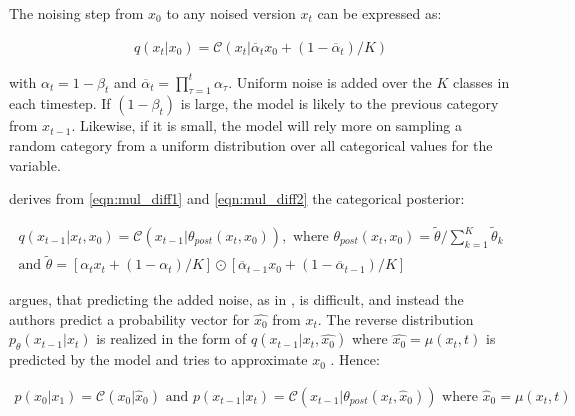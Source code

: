 The noising step from $x_0$ to any noised version $x_t$ can be expressed as:

\begin{equation}
  \begin{align*}
    \label{eqn:mul_diff2}
    q(x_{t}|x_{0}) = \mathcal{C}(x_t|\overline{\alpha}_tx_{0}+(1-\overline{\alpha}_t)/K)
  \end{align*}
\end{equation}

with $\alpha_t = 1-\beta_t$ and $\overline{\alpha}_t = \prod_{\tau=1}^{t}\alpha_\tau$.
Uniform noise is added over the $K$ classes in each timestep.
If $(1-\beta_t)$ is large, the model is likely to the previous category from $x_{t-1}$. 
Likewise, if it is small, the model will rely more on sampling a random category from a uniform distribution over all categorical values for the variable.

\cite{hoogeboom2021ArgmaxFlowsMultinomial} derives from \autoref{eqn:mul_diff1} and \autoref{eqn:mul_diff2} the categorical posterior:

\begin{equation}
  \begin{gathered}
  \label{eqn:mul_diff3}
  q(x_{t-1}|x_t, x_{0}) = \mathcal{C}(x_{t-1}|\theta_{post}(x_t,x_0)),\textrm{ where } \theta_{post}(x_t,x_0)=\tilde{\theta}/\sum_{k=1}^{K}\tilde{\theta}_k \\
  \textrm{and } \tilde{\theta} = \left[\alpha_tx_{t}+(1-\alpha_t)/K \right] \odot \left[\overline{\alpha}_{t-1}x_{0}+(1-\overline{\alpha}_{t-1})/K \right]
  \end{gathered}
\end{equation}

\cite{hoogeboom2021ArgmaxFlowsMultinomial} argues, that predicting the added noise, as in \cite{ho2020DenoisingDiffusionProbabilistic},
is difficult, and instead the authors predict a probability vector for $\hat{x_0}$ from $x_t$.
The reverse distribution $p_\theta(x_{t-1}|x_t)$ is realized in the form of $q(x_{t-1}|x_t,\hat{x_0})$ where $\hat{x_0}=\mu(x_t, t)$ is predicted by the model and tries to approximate $x_0$ \cite{hoogeboom2021ArgmaxFlowsMultinomial}.
Hence:

\begin{equation}
  \begin{align*}
    \label{eqn:mul_diff4}
    p(x_0|x_1) = \mathcal{C}(x_0|\hat{x}_0) \textrm{ and } p(x_{t-1}|x_t) =  \mathcal{C}(x_{t-1}|\theta_{post}(x_t, \hat{x}_0)) \textrm{ where } \hat{x}_0=\mu(x_t,t)
  \end{align*}
\end{equation}

